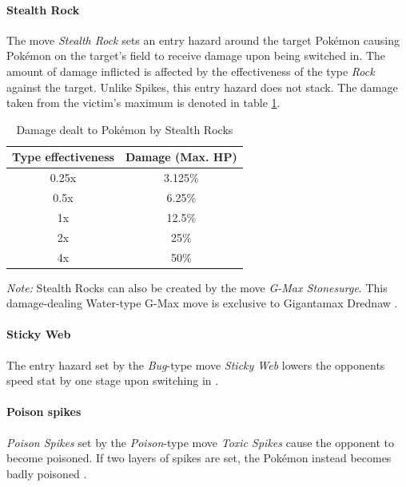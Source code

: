 \paragraph{Stealth Rock}
\label{sec:stealthrock}
The move \textit{Stealth Rock} sets an entry hazard around the target Pokémon
causing Pokémon on the target's field to receive damage upon being switched in.
The amount of damage inflicted is affected by the effectiveness of the type
\textit{Rock} against the target. Unlike Spikes, this entry hazard does not stack.
The damage taken from the victim's maximum is denoted in table 
\ref{tab:stealth-rock-damage}\cite{Bulbapedia:StealthRock}.
\begin{table}[h]
	\label{tab:stealth-rock-damage}
	\centering
	\begin{tabular}{|c|c|}
		\hline
		\textbf{Type effectiveness} & \textbf{Damage (Max. \ac{HP}}) \\
		\hline 
		0.25x & 3.125\% \\ 
		\hline 
		0.5x &  6.25\% \\ 
		\hline 
		1x & 12.5\% \\
		\hline
		2x & 25\% \\
		\hline
		4x & 50\% \\
		\hline
	\end{tabular} 
	\caption{Damage dealt to Pokémon by Stealth Rocks\cite{Bulbapedia:StealthRock}}
\end{table}
\textit{Note:} Stealth Rocks can also be created by the move \textit{G-Max Stonesurge}.
This damage-dealing Water-type G-Max move is exclusive to Gigantamax Drednaw
\cite{Bulbapedia:GMaxStonesurge}. \\

\paragraph{Sticky Web}
The entry hazard set by the \textit{Bug}-type move \textit{Sticky Web} lowers the
opponents speed stat by one stage upon switching in \cite{Bulbapedia:StickyWeb}. \\

\paragraph{Poison spikes}
\label{sec:poison-spikes}
\textit{Poison Spikes} set by the \textit{Poison}-type move \textit{Toxic Spikes}
cause the opponent to become poisoned. If two layers of spikes are set, the
Pokémon instead becomes badly poisoned \cite{Bulbapedia:ToxicSpikes}. \\
 \\

